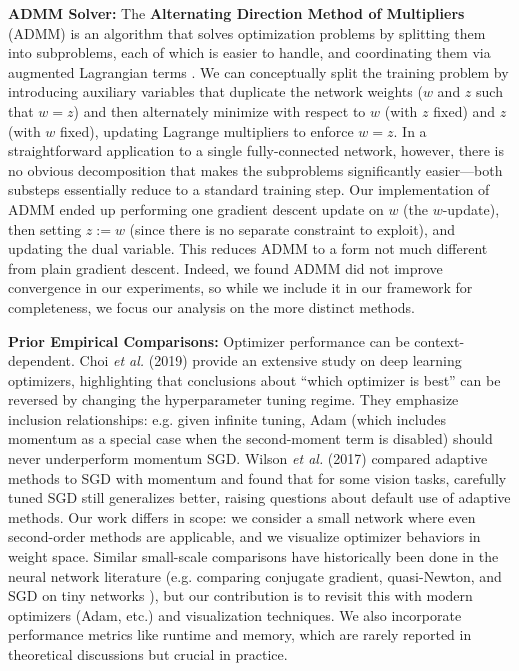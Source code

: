 \documentclass[12pt]{article}
\begin{document}
\textbf{ADMM Solver:} The \textbf{Alternating Direction Method of Multipliers} (ADMM) is an algorithm that solves optimization problems by splitting them into subproblems, each of which is easier to handle, and coordinating them via augmented Lagrangian terms \cite{Boyd2011ADMM}. We can conceptually split the training problem by introducing auxiliary variables that duplicate the network weights ($w$ and $z$ such that $w = z$) and then alternately minimize with respect to $w$ (with $z$ fixed) and $z$ (with $w$ fixed), updating Lagrange multipliers to enforce $w=z$. In a straightforward application to a single fully-connected network, however, there is no obvious decomposition that makes the subproblems significantly easier—both substeps essentially reduce to a standard training step. Our implementation of ADMM ended up performing one gradient descent update on $w$ (the $w$-update), then setting $z := w$ (since there is no separate constraint to exploit), and updating the dual variable. This reduces ADMM to a form not much different from plain gradient descent. Indeed, we found ADMM did not improve convergence in our experiments, so while we include it in our framework for completeness, we focus our analysis on the more distinct methods.

\textbf{Prior Empirical Comparisons:} Optimizer performance can be context-dependent. Choi \textit{et al.} (2019) provide an extensive study on deep learning optimizers, highlighting that conclusions about “which optimizer is best” can be reversed by changing the hyperparameter tuning regime. They emphasize inclusion relationships: e.g. given infinite tuning, Adam (which includes momentum as a special case when the second-moment term is disabled) should never underperform momentum SGD. Wilson \textit{et al.} (2017) compared adaptive methods to SGD with momentum and found that for some vision tasks, carefully tuned SGD still generalizes better, raising questions about default use of adaptive methods. Our work differs in scope: we consider a small network where even second-order methods are applicable, and we visualize optimizer behaviors in weight space. Similar small-scale comparisons have historically been done in the neural network literature (e.g. comparing conjugate gradient, quasi-Newton, and SGD on tiny networks \cite{LeCun1998NNopt}), but our contribution is to revisit this with modern optimizers (Adam, etc.) and visualization techniques. We also incorporate performance metrics like runtime and memory, which are rarely reported in theoretical discussions but crucial in practice.
\end{document}
